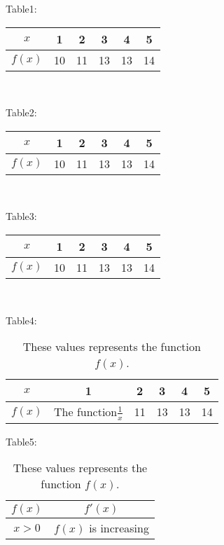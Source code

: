 \documentclass[11pt]{article}
\begin{document}
Table1: \\[5pt]
\begin{tabular}{|c|c|c|c|c|c|}
\hline
$x$ & 1 & 2 & 3 & 4 & 5\\ \hline
$f(x)$ & 10 & 11 & 13 & 13 & 14\\ \hline
\end{tabular} \\

\vspace{1cm}

Table2: \\[5pt]
\begin{tabular}{|c||c|c|c|c|c|}
\hline
$x$ & 1 & 2 & 3 & 4 & 5\\ \hline
$f(x)$ & 10 & 11 & 13 & 13 & 14\\ \hline
\end{tabular} \\

\vspace{1cm}

Table3: \\[5pt]
\begin{tabular}{|c||c|c|c|c|c|}
\hline
$x$ & 1 & 2 & 3 & 4 & 5\\ \hline
$f(x)$ & 10 & 11 & 13 & 13 & 14\\ \hline
\end{tabular} \\

\vspace{1cm}

Table4: \\[5pt]
\begin{table}[H]
\centering
\def\arraystretch{1.5}
\begin{tabular}{|c||c|c|c|c|c|}
\hline
$x$ & 1 & 2 & 3 & 4 & 5\\ \hline
$f(x)$ & The function$\frac{1}{x}$ & 11 & 13 & 13 & 14\\ \hline
\end{tabular}
\caption{These values represents the function $f(x)$.}
\end{table}
\vspace{1cm}

Table5: \\[5pt]
\begin{table}[H]
\centering
\caption{These values represents the function $f(x)$.}
\def\arraystretch{1.5}
\begin{tabular}{|c|c|}
\hline
$f(x)$ & $f'(x)$\\ \hline
$x>0$ & $f(x)$ is increasing\\ \hline
\end{tabular}
\end{table}
\end{document}
